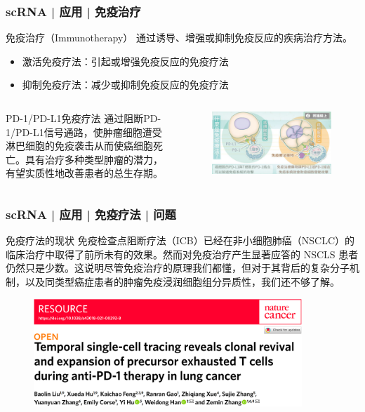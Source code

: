 \documentclass[11pt]{ctexbeamer}
\begin{document}
\begin{frame}
  \frametitle{scRNA | 应用 | 免疫治疗}
  \begin{block}{免疫治疗（Immunotherapy）}
  通过诱导、增强或抑制免疫反应的疾病治疗方法。
  \begin{itemize}
    \item 激活免疫疗法：引起或增强免疫反应的免疫疗法
    \item 抑制免疫疗法：减少或抑制免疫反应的免疫疗法
  \end{itemize}
  \end{block}
  \pause
  \begin{columns}
    \begin{block}{PD-1/PD-L1免疫疗法}
 通过阻断PD-1/PD-L1信号通路，使肿瘤细胞遭受淋巴细胞的免疫袭击从而使癌细胞死亡。具有治疗多种类型肿瘤的潜力，有望实质性地改善患者的总生存期。
  \end{block}
     \begin{figure}
    \centering
    \includegraphics[width=\textwidth]{tumor_PD1_01.png}
  \end{figure}
 \end{columns}
\end{frame}

\begin{frame}
  \frametitle{scRNA | 应用 | 免疫疗法 | 问题}
  \begin{block}{免疫疗法的现状}
  免疫检查点阻断疗法（ICB）已经在非小细胞肺癌（NSCLC）的临床治疗中取得了前所未有的效果。然而对免疫治疗产生显著应答的 NSCLS 患者仍然只是少数。这说明尽管免疫治疗的原理我们都懂，但对于其背后的复杂分子机制，以及同类型癌症患者的肿瘤免疫浸润细胞组分异质性，我们还不够了解。
  \end{block}
   \begin{figure}
    \centering
    \includegraphics[width=0.9\textwidth]{PD1_NC.png}
  \end{figure}
\end{frame}
\end{document}
